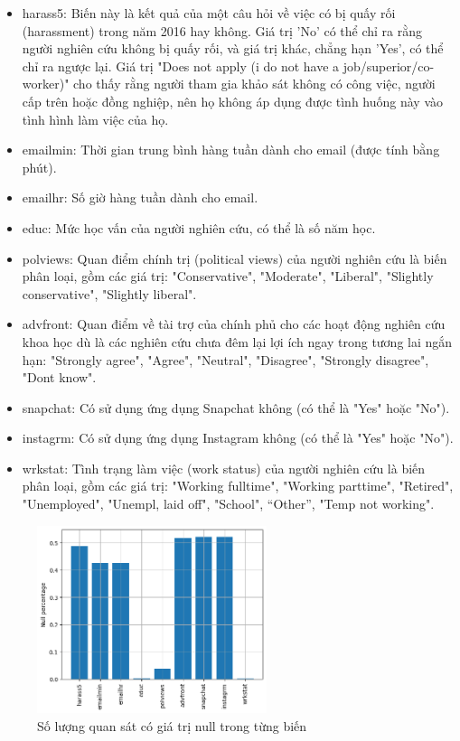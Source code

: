 \begin{itemize}
    \item harass5: Biến này là kết quả của một câu hỏi về việc có bị quấy rối (harassment) trong năm 2016 hay không. 
    Giá trị 'No' có thể chỉ ra rằng người nghiên cứu không bị quấy rối, và giá trị khác, chẳng hạn 'Yes', có thể chỉ ra ngược lại. Giá trị "Does not apply (i do not have a job/superior/co-worker)" cho thấy rằng người tham gia khảo sát không có công việc, người cấp trên hoặc đồng nghiệp, nên họ không áp dụng được tình huống này vào tình hình làm việc của họ.
    \item emailmin: Thời gian trung bình hàng tuần dành cho email (được tính bằng phút).
    \item emailhr: Số giờ hàng tuần dành cho email.
    \item educ: Mức học vấn của người nghiên cứu, có thể là số năm học.
    \item polviews: Quan điểm chính trị (political views) của người nghiên cứu là biến phân loại, gồm các giá trị: "Conservative", "Moderate", "Liberal", "Slightly conservative", "Slightly liberal".
    \item advfront: Quan điểm về tài trợ của chính phủ cho các hoạt động nghiên cứu khoa học dù là các nghiên cứu chưa đêm lại lợi ích ngay trong tương lai ngắn hạn: "Strongly agree", "Agree", "Neutral", "Disagree", "Strongly disagree", "Dont know".
    \item snapchat: Có sử dụng ứng dụng Snapchat không (có thể là "Yes" hoặc "No").
    \item instagrm: Có sử dụng ứng dụng Instagram không (có thể là "Yes" hoặc "No").
    \item wrkstat: Tình trạng làm việc (work status) của người nghiên cứu là biến phân loại, gồm các giá trị: "Working fulltime", "Working parttime", "Retired", "Unemployed", "Unempl, laid off", "School", “Other”, "Temp not working".
\end{itemize}

\begin{figure}[h!]
    \centering
    \includegraphics[width=0.6\textwidth]{figures/Thanh/Data_Analysis/null_percentage_columns.png}
    \caption{Số lượng quan sát có giá trị null trong từng biến}
    \label{fig:null_percentage_columns}
\end{figure}

